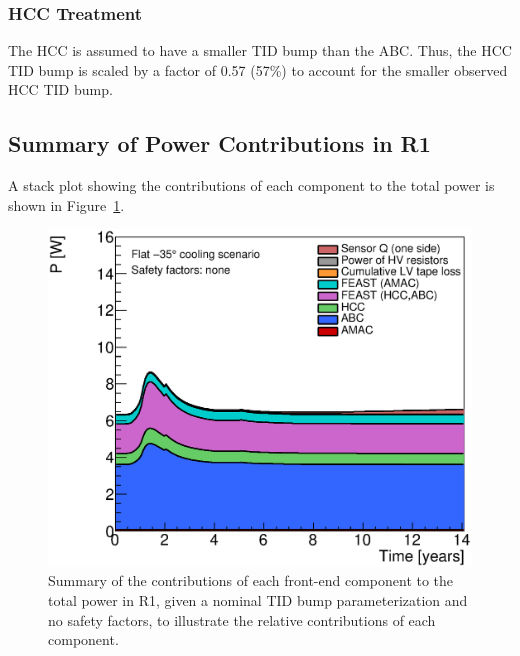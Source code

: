 \subsubsection*{HCC Treatment}

The HCC is assumed to have a smaller TID bump than the ABC. Thus, the HCC TID bump
is scaled by a factor of 0.57 (57\%) to account for the smaller observed HCC TID bump.

\subsection{Summary of Power Contributions in R1}

A stack plot showing the contributions of each component to the total power is shown in
Figure~\ref{power_stackplot}.

\begin{figure}[ht!]
\begin{center}
\includegraphics[width=0.59\linewidth]{figures/PowerStackPlot.eps}
\end{center}
\caption{Summary of the contributions of each front-end component to the total power in R1, given
a nominal TID bump parameterization and no safety factors, to illustrate the relative contributions
of each component.}
\label{power_stackplot}
\end{figure}

